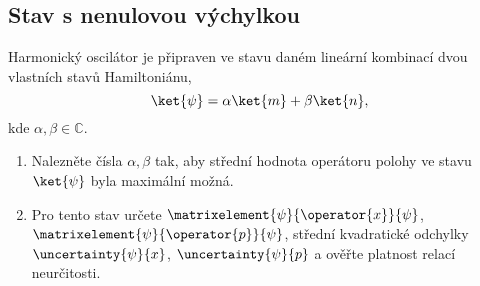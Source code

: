\subsection{Stav s nenulovou výchylkou}
Harmonický oscilátor je připraven ve stavu daném lineární kombinací dvou vlastních stavů Hamiltoniánu,
\begin{equation}
    \ket{\psi}=\alpha\ket{m}+\beta\ket{n},
\end{equation}
kde $\alpha,\beta\in\mathbb{C}$.

\begin{enumerate}
\item
    Nalezněte čísla $\alpha,\beta$ tak, aby střední hodnota operátoru polohy ve stavu $\ket{\psi}$ byla maximální možná.
    
\item
    Pro tento stav určete $\matrixelement{\psi}{\operator{x}}{\psi}$, $\matrixelement{\psi}{\operator{p}}{\psi}$,
    střední kvadratické odchylky $\uncertainty{\psi}{x}$, $\uncertainty{\psi}{p}$ a ověřte platnost relací neurčitosti.
\end{enumerate}
	

